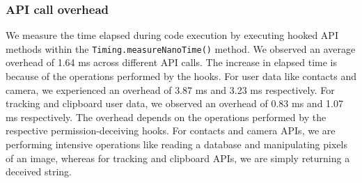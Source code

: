 
\subsubsection*{\textbf{API call overhead}} 
We measure the time elapsed during code execution by executing hooked
API methods within the \texttt{Timing.measureNanoTime()} method.
We observed an average overhead of 1.64 ms across different API calls.
The increase in elapsed time is because of the operations performed by the
hooks. For user data like contacts and camera, we experienced an overhead of
3.87 ms and 3.23 ms respectively. For tracking and clipboard user data, we
observed an overhead of 0.83 ms and 1.07 ms respectively. The overhead depends
on the operations performed by the respective permission-deceiving hooks. For
contacts and camera APIs, we are performing intensive operations like reading a
database and manipulating pixels of an image, whereas for tracking and clipboard
APIs, we are simply returning a deceived string.

